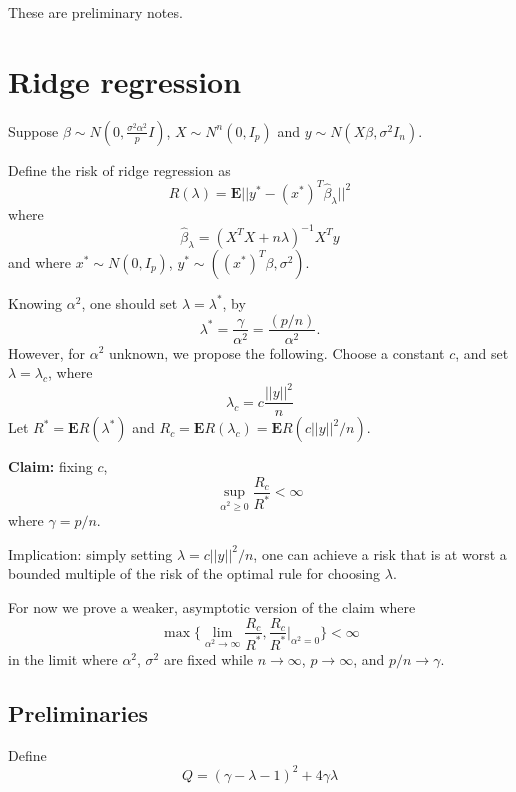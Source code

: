 \documentclass[12pt]{article}
\begin{document}
\maketitle

\newcommand{\tr}{\text{tr}}
\newcommand{\E}{\textbf{E}}
\newcommand{\diag}{\text{diag}}
\newcommand{\argmax}{\text{argmax}}
\newcommand{\Cov}{\text{Cov}}
\newcommand{\Var}{\text{Var}}
\newcommand{\argmin}{\text{argmin}}
\newcommand{\Vol}{\text{Vol}}
\newcommand{\comm}[1]{}

These are preliminary notes.

\section{Ridge regression}

Suppose $\beta \sim N(0, \frac{\sigma^2\alpha^2}{p} I)$, $X \sim N^n(0, I_p)$ and $y \sim N(X\beta, \sigma^2 I_n)$.

Define the risk of ridge regression as
\[
R(\lambda) = \E ||y^* - (x^*)^T \hat{\beta}_\lambda||^2
\]
where
\[
\hat{\beta}_\lambda = (X^T X + n\lambda)^{-1} X^T y
\]
and where $x^* \sim N(0, I_p)$, $y^* \sim ((x^*)^T\beta, \sigma^2)$.

Knowing $\alpha^2$, one should set $\lambda = \lambda^*$, by
\[
\lambda^* = \frac{\gamma}{\alpha^2} = \frac{(p/n)}{\alpha^2}.
\]
However, for $\alpha^2$ unknown, we propose the following.
Choose a constant $c$, and set  $\lambda = \lambda_c$, where
\[
\lambda_c = c\frac{||y||^2}{n}
\]
Let $R^* = \E R(\lambda^*)$ and $R_c = \E R(\lambda_c) = \E R(c||y||^2/n)$.

\textbf{Claim:} fixing $c$, 
\[
\sup_{\alpha^2 \geq 0} \frac{R_c}{R^*} < \infty
\]
where $\gamma = p/n$.

Implication: simply setting $\lambda = c||y||^2/n$, one can achieve a risk that is at worst a bounded multiple of the risk of the optimal rule for choosing $\lambda$.

For now we prove a weaker, asymptotic version of the claim where
\[
\max\{\lim_{\alpha^2 \to \infty} \frac{R_c}{R^*}, \frac{R_c}{R^*}\bigg|_{\alpha^2 = 0} \} < \infty
\]
in the limit where $\alpha^2$, $\sigma^2$ are fixed while $n \to \infty$, $p\to\infty$, and $p/n \to \gamma$.

\subsection{Preliminaries}

Define
\[
Q = (\gamma - \lambda - 1)^2 + 4\gamma \lambda
\]
\end{document}
